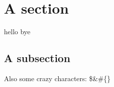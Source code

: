 \documentclass{article}%
\begin{document}
%
\normalsize%
\section{A section}%
\label{sec:Asection}%
\newline%
hello\newline%
\newline%
bye \newline%

%
\subsection{A subsection}%
\label{subsec:Asubsection}%
Also some crazy characters: \$\&\#\{\}

%
\end{document}
